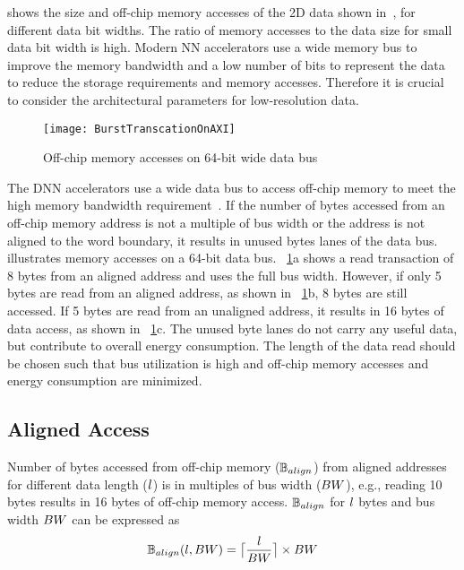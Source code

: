  shows the size and off-chip memory accesses of the 2D data shown in~, for different data bit widths. The ratio of memory accesses to the data size for small data bit width is high. Modern NN accelerators use a wide memory bus to improve the memory bandwidth and a low number of bits to represent the data to reduce the storage requirements and memory accesses. Therefore it is crucial to consider the architectural parameters for low-resolution data.
\begin{figure}[!htb]
	\centering
	\captionsetup{font=sf}	
	\texttt{[image: BurstTranscationOnAXI]}
	\caption{Off-chip memory accesses on 64-bit wide data bus}
	\label{fig:AXI_AccesseOn64BitDataBus}
\end{figure}

The DNN accelerators use a wide data bus to access off-chip memory to meet the high memory bandwidth requirement~\cite{Chen2016EyerissAS,chen2014diannao}. If the number of bytes accessed from an off-chip memory address is not a multiple of bus width or the address is not aligned to the word boundary, it results in unused bytes lanes of the data bus.  illustrates memory accesses on a 64-bit data bus. \figurename{~\ref{fig:AXI_AccesseOn64BitDataBus}a} shows a read transaction of 8 bytes from an aligned address and uses the full bus width. However, if only 5 bytes are read from an aligned address, as shown in \figurename{~\ref{fig:AXI_AccesseOn64BitDataBus}b}, 8 bytes are still accessed. If 5 bytes are read from an unaligned address, it results in 16 bytes of data access, as shown in \figurename{~\ref{fig:AXI_AccesseOn64BitDataBus}c}. The unused byte lanes do not carry any useful data, but contribute to overall energy consumption. The length of the data read should be chosen such that bus utilization is high and off-chip memory accesses and energy consumption are minimized.
\subsection{Aligned Access}
Number of bytes accessed from off-chip memory ($\numBytesOffChip_{align}$) from aligned addresses for different data length ($\dataLength$) is in multiples of bus width ($\busWidth$), e.g., reading 10 bytes results in 16 bytes of off-chip memory access.  $\numBytesOffChip_{align}$ for $\dataLength$ bytes and bus width $\busWidth$ can be expressed as
\begin{align}\label{eq:alignedAccess}
	\begin{aligned}[b]
		\numBytesOffChip_{align}(\dataLength,\busWidth) = \ceil[\big]{\frac{\dataLength}{\busWidth}}\times {\busWidth}
	\end{aligned}
\end{align}
